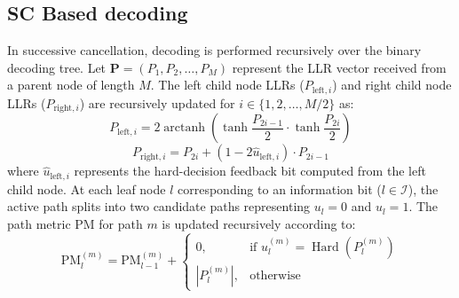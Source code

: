 \documentclass[journal,10pt,twocolumn]{IEEEtran}
\begin{document}
\subsection{SC Based decoding}
In successive cancellation, decoding is performed recursively over the binary decoding tree. Let $\mathbf{P} = (P_1, P_2, \dots, P_M)$ represent the LLR vector received from a parent node of length $M$. The left child node LLRs ($P_{\text{left}, i}$) and right child node LLRs ($P_{\text{right}, i}$) are recursively updated for $i \in \{1, 2, \dots, M/2\}$ as:
\begin{equation}
P_{\text{left}, i} = 2 \operatorname{arctanh}\left( \tanh\frac{P_{2i-1}}{2} \cdot \tanh\frac{P_{2i}}{2} \right)
\end{equation}
\begin{equation}
P_{\text{right}, i} = P_{2i} + (1 - 2\hat{u}_{\text{left}, i}) \cdot P_{2i-1}
\end{equation}
where $\hat{u}_{\text{left}, i}$ represents the hard-decision feedback bit computed from the left child node. At each leaf node $l$ corresponding to an information bit ($l \in \mathcal{I}$), the active path splits into two candidate paths representing $u_l = 0$ and $u_l = 1$. The path metric PM for path $m$ is updated recursively according to:
\begin{equation}
\text{PM}_l^{(m)} = \text{PM}_{l-1}^{(m)} + \begin{cases} 0, & \text{if } u_l^{(m)} = \operatorname{Hard}(P_l^{(m)}) \\ |P_l^{(m)}|, & \text{otherwise} \end{cases}
\end{equation}
\end{document}
